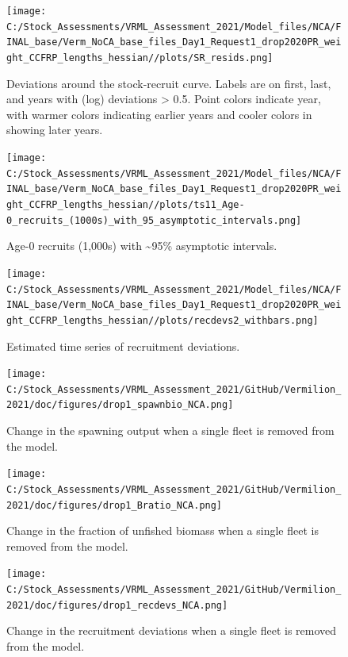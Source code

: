 \documentclass[11pt,
  english,
]{article}
\begin{document}
\begin{figure}
\centering
\texttt{[image: C:/Stock\_Assessments/VRML\_Assessment\_2021/Model\_files/NCA/FINAL\_base/Verm\_NoCA\_base\_files\_Day1\_Request1\_drop2020PR\_weight\_CCFRP\_lengths\_hessian//plots/SR\_resids.png]}
\caption{Deviations around the stock-recruit curve. Labels are on first, last, and years with (log) deviations \textgreater{} 0.5. Point colors indicate year, with warmer colors indicating earlier years and cooler colors in showing later years.\label{fig:bh-resids}}
\end{figure}

\FloatBarrier

\begin{figure}
\centering
\texttt{[image: C:/Stock\_Assessments/VRML\_Assessment\_2021/Model\_files/NCA/FINAL\_base/Verm\_NoCA\_base\_files\_Day1\_Request1\_drop2020PR\_weight\_CCFRP\_lengths\_hessian//plots/ts11\_Age-0\_recruits\_(1000s)\_with\_95\_asymptotic\_intervals.png]}
\caption{Age-0 recruits (1,000s) with \textasciitilde95\% asymptotic intervals.\label{fig:recruits}}
\end{figure}

\begin{figure}
\centering
\texttt{[image: C:/Stock\_Assessments/VRML\_Assessment\_2021/Model\_files/NCA/FINAL\_base/Verm\_NoCA\_base\_files\_Day1\_Request1\_drop2020PR\_weight\_CCFRP\_lengths\_hessian//plots/recdevs2\_withbars.png]}
\caption{Estimated time series of recruitment deviations.\label{fig:recdevs}}
\end{figure}

\FloatBarrier

\begin{figure}
\centering
\texttt{[image: C:/Stock\_Assessments/VRML\_Assessment\_2021/GitHub/Vermilion\_2021/doc/figures/drop1\_spawnbio\_NCA.png]}
\caption{Change in the spawning output when a single fleet is removed from the model.\label{fig:drop-spawnbio}}
\end{figure}

\begin{figure}
\centering
\texttt{[image: C:/Stock\_Assessments/VRML\_Assessment\_2021/GitHub/Vermilion\_2021/doc/figures/drop1\_Bratio\_NCA.png]}
\caption{Change in the fraction of unfished biomass when a single fleet is removed from the model.\label{fig:drop-bratio}}
\end{figure}

\begin{figure}
\centering
\texttt{[image: C:/Stock\_Assessments/VRML\_Assessment\_2021/GitHub/Vermilion\_2021/doc/figures/drop1\_recdevs\_NCA.png]}
\caption{Change in the recruitment deviations when a single fleet is removed from the model.\label{fig:drop-recdev}}
\end{figure}
\end{document}

